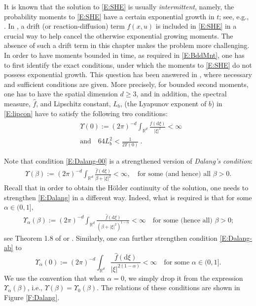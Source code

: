 \documentclass[12pt]{report}
\theoremstyle{plain}
\theoremstyle{definition}
\numberwithin{equation}{section}
\newcommand{\R}{\mathbb{R}}
\newcommand{\ud}{\ensuremath{ \mathrm{d} }}
\begin{document}
It is known that the solution to \eqref{E:SHE} is usually {\it intermittent}, namely, the
probability moments to \eqref{E:SHE} have a certain exponential growth in $t$; see, e.g.,
\cite{carmona.molchanov:94:parabolic,foondun.khoshnevisan:09:intermittence}. In
\cite{assing.manthey:03:invariant,misiats.stanzhytskyi.ea:20:invariant,misiats.stanzhytskyi.ea:16:existence},
a drift (or reaction-diffusion) term $f(x,u)$ is included in \eqref{E:SHE} in a crucial way to help cancel the otherwise exponential growing moments. The absence of such a drift term in this chapter
makes the problem more challenging. In order to have moments bounded in time, as required in
\eqref{E:BddMnt}, one has to first identify the exact conditions, under which the moments to
\eqref{E:SHE} do not possess exponential growth. This question has been answered in \cite[Theorem
1.3 and Lemma 2.5]{chen.kim:19:nonlinear}, where necessary and sufficient conditions are given. More
precisely, for bounded second moments, one has to have the spatial dimension $d \ge 3$, and in
addition, the spectral measure, $\hat{f}$, and Lipschitz constant, $L_b$, (the Lyapunov exponent of
$b$) in \eqref{E:lipcon} have to satisfy the following two conditions:
\begin{subequations} \label{E:U0finite}
	\begin{align} \label{E:Dalang-00}
	& \Upsilon(0) := \left(2\pi\right)^{-d} \int_{\R^d} \frac{\hat{f}(\ud \xi)}{|\xi|^2} <\infty \\
	& \text{and} \quad 64 L^2_{b}   <  \frac{1}{2\Upsilon(0)}\:.\label{E:Lipb}
	\end{align}
\end{subequations}

Note that condition \eqref{E:Dalang-00} is a strengthened version of {\it Dalang's condition}:
\begin{align} \label{E:Dalang}
\Upsilon(\beta) := \left(2\pi\right)^{-d} \int_{\R^d} \frac{\hat{f}(\ud \xi)}{\beta+ |\xi|^2} <\infty,
\quad \text{for some (and hence) all $\beta>0$.}
\end{align}
Recall that in order to obtain the H\"older continuity of the solution, one needs to strengthen
\eqref{E:Dalang} in a different way. Indeed, what is required is that for some $\alpha\in (0,1]$,
\begin{align} \label{E:Dalang-ab}
\Upsilon_\alpha(\beta) := \left(2\pi\right)^{-d} \int_{\R^d} \frac{\widehat{f}(\ud\xi)}{\left(\beta+|\xi|^2\right)^{1-\alpha}}<\infty
\quad \text{for some (hence all) $\beta>0$;}
\end{align}
see Theorem 1.8 of \cite{chen.huang:19:comparison} or \cite{sanz-sole.sarra:02:holder}. Similarly,
one can further strengthen condition \eqref{E:Dalang-ab} to
\begin{equation} \label{E:Dalang-a0}
\Upsilon_\alpha(0) := \left(2\pi\right)^{-d} \int_{\R^d} \frac{\hat{f}(\ud \xi)}{|\xi|^{2(1-\alpha)}} <\infty
\quad  \text{for some $\alpha\in (0,1]$.}
\end{equation}
We use the convention that when $\alpha=0$, we simply drop it from the expression
$\Upsilon_\alpha(\beta)$, i.e., $\Upsilon(\beta)=\Upsilon_0(\beta)$. The relations of these
conditions are shown in Figure \ref{F:Dalang}.
\end{document}
